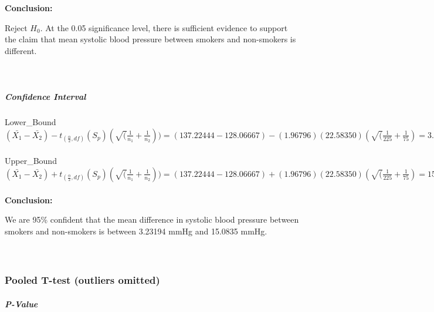 \documentclass[
]{article}
\begin{document}
\textbf{Conclusion:}

Reject \(H_{0}\). At the 0.05 significance level, there is sufficient
evidence to support the claim that mean systolic blood pressure between
smokers and non-smokers is different.\\
~\\
~\\

\hypertarget{confidence-interval}{%
\subparagraph{\texorpdfstring{\textbf{Confidence
Interval}}{Confidence Interval}}\label{confidence-interval}}

\hfill\break
Lower\_Bound\\
\((\bar{X_{1}}-\bar{X_{2}}) - t_{(\frac{\alpha}{2},df)}(S_{p})(\sqrt(\frac{1}{n_{1}}+\frac{1}{n_{2}})) = (137.22444 - 128.06667) - (1.96796)(22.58350)(\sqrt(\frac{1}{225}+\frac{1}{75}) = 3.23194\)\\
~\\
Upper\_Bound\\
\((\bar{X_{1}}-\bar{X_{2}}) + t_{(\frac{\alpha}{2},df)}(S_{p})(\sqrt(\frac{1}{n_{1}}+\frac{1}{n_{2}})) = (137.22444 - 128.06667) + (1.96796)(22.58350)(\sqrt(\frac{1}{225}+\frac{1}{75}) = 15.0835\)\\
~\\

\textbf{Conclusion:}

We are 95\% confident that the mean difference in systolic blood
pressure between smokers and non-smokers is between 3.23194 mmHg and
15.0835 mmHg.\\
~\\
~\\

\hypertarget{pooled-t-test-outliers-omitted}{%
\subsubsection{Pooled T-test (outliers
omitted)}\label{pooled-t-test-outliers-omitted}}

\hypertarget{p-value-1}{%
\subparagraph{\texorpdfstring{\textbf{P-Value}}{P-Value}}\label{p-value-1}}
\end{document}
